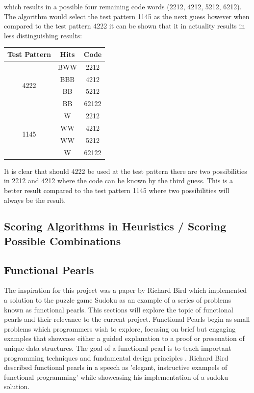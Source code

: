 \documentclass[12pt]{article}  %
\theoremstyle{definition}
\theoremstyle{remark}
\begin{document}
which results in a possible four remaining code words (2212, 4212, 5212, 6212). The algorithm would select the test pattern 1145 as the next guess however when compared to the test pattern 4222 it can be shown that it in actuality results in less distinguishing results:
\\
{
\centering
\begin{tabular}{ccc}
Test Pattern          & Hits & Code  \\ \hline
\multirow{4}{*}{4222} & BWW  & 2212  \\
                      & BBB  & 4212  \\
                      & BB   & 5212  \\
                      & BB   & 62122 \\ \hline
\multirow{4}{*}{1145} & W    & 2212  \\
                      & WW   & 4212  \\
                      & WW   & 5212  \\
                      & W    & 62122
\end{tabular} \par
} 

It is clear that should 4222 be used at the test pattern there are two possibilities in 2212 and 4212 where the code can be known by the third guess. This is a better result compared to the test pattern 1145 where two possibilities will always be the result.

\subsection {Scoring Algorithms in Heuristics / Scoring Possible Combinations}

\subsection {Functional Pearls}
The inspiration for this project was a paper by Richard Bird which implemented a solution to the puzzle game Sudoku as an example of a series of problems known as functional pearls. This sections will explore the topic of functional pearls and their relevance to the current project. Functional Pearls begin as small problems which programmers wish to explore, focusing on brief but engaging examples that showcase either a guided explanation to a proof or presenation of unique data structures. The goal of a functional pearl is to teach important programming techniques and fundamental design principles \cite{Pearls}.  Richard Bird described functional pearls in a speech as 'elegant, instructive exampels of functional programming' while showcasing his implementation of a sudoku solution\cite {R. Bird Speech}.
\end{document}
